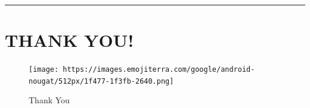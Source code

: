\documentclass[
]{article}
\begin{document}
\begin{center}\rule{0.5\linewidth}{0.5pt}\end{center}

\hypertarget{thank-you}{%
\section{THANK YOU!}\label{thank-you}}

\begin{figure}
\centering
\texttt{[image: https://images.emojiterra.com/google/android-nougat/512px/1f477-1f3fb-2640.png]}
\caption{Thank You}
\end{figure}
\end{document}
